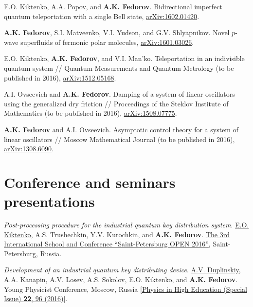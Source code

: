 \documentclass[10pt,a4paper,sans]{moderncv}
\begin{document}
	{E.O. Kiktenko, A.A. Popov, and {\textbf{A.K. Fedorov}. 
	Bidirectional imperfect quantum teleportation with a single Bell state,
	{\textcolor{blue}{\href{http://arxiv.org/abs/1602.01420}{arXiv:1602.01420}}}.}}

	{{\textbf{A.K. Fedorov}, S.I. Matveenko, V.I. Yudson, and G.V. Shlyapnikov. 
	Novel $p$-wave superfluids of fermonic polar molecules,
	{\textcolor{blue}{\href{http://arxiv.org/abs/1601.03026}{arXiv:1601.03026}}}.}}

	{E.O. Kiktenko, {\textbf{A.K. Fedorov}, and V.I. Man'ko. 
	Teleportation in an indivisible quantum system //
	Quantum Measurements and Quantum Metrology (to be published in 2016),
	{\textcolor{blue}{\href{http://arxiv.org/abs/1512.05168}{arXiv:1512.05168}}}.}}

	{A.I. Ovseevich and \textbf{A.K. Fedorov}. 
	Damping of a system of linear oscillators using the generalized dry friction // 
	Proceedings of the Steklov Institute of Mathematics (to be published in 2016),
	{\textcolor{blue}{\href{http://arxiv.org/abs/1508.07775}{arXiv:1508.07775}}}.}
	
	{\textbf{A.K. Fedorov} and A.I. Ovseevich. 
	Asymptotic control theory for a system of linear oscillators // 
	Moscow Mathematical Journal (to be published in 2016),
	{\textcolor{blue}{\href{http://arxiv.org/abs/1308.6090}{arXiv:1308.6090}}}.}
	
\section{Conference and seminars presentations}
	
	{\textit{Post-processing procedure for the industrial quantum key distribution system}.
	\underline{E.O. Kiktenko}, A.S. Trushechkin, Y.V. Kurochkin, and \textbf{A.K. Fedorov}.
	\textcolor{blue}{\href{http://spbopen.spbau.com}{The 3rd International School and Conference ``Saint-Petersburg OPEN 2016''}}, Saint-Petersburg, Russia.}
	
	{\textit{Development of an industrial quantum key distributing device}.
	\underline{A.V. Duplinskiy}, A.A. Kanapin, A.V. Losev, A.S. Sokolov, E.O. Kiktenko, and \textbf{A.K. Fedorov}.
	Young Physicist Conference, Moscow, Russia
	[\textcolor{blue}{\href{http://konkmolphys.moomfo.ru/application/2015}{Physics in High Education (Special Issue) \textbf{22}, 96 (2016)}}].}
\end{document}
